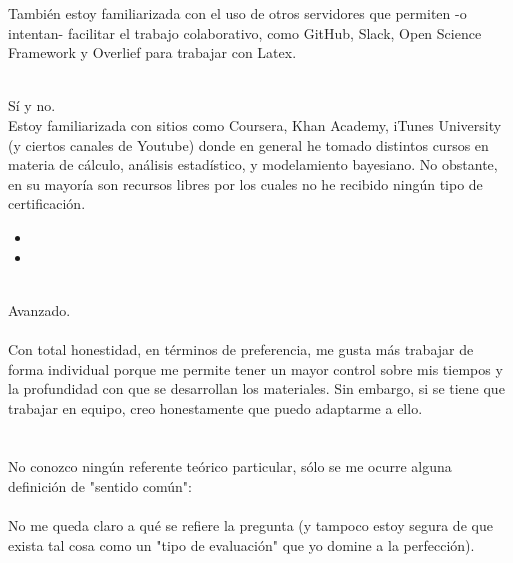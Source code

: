 \documentclass[11pt]{article}
\begin{document}
\begin{question}
También estoy familiarizada con el uso de otros servidores que permiten -o intentan- facilitar el trabajo colaborativo, como GitHub, Slack, Open Science Framework y Overlief para trabajar con Latex.

\\

Sí y no.\\

Estoy familiarizada con sitios como Coursera, Khan Academy, iTunes University (y ciertos canales de Youtube) donde en general he tomado distintos cursos en materia de cálculo, análisis estadístico, y modelamiento bayesiano. No obstante, en su mayoría son recursos libres por los cuales no he recibido ningún tipo de certificación.\\

\begin{itemize}
	\item
	\item
\end{itemize}


\\
Avanzado.\\

\\
Con total honestidad, en términos de preferencia, me gusta más trabajar de forma individual porque me permite tener un mayor control sobre mis tiempos y la profundidad con que se desarrollan los materiales. Sin embargo, si se tiene que trabajar en equipo, creo honestamente que puedo adaptarme a ello.\\

\\


\\
No conozco ningún referente teórico particular, sólo se me ocurre alguna definición de "sentido común":\\

\\
No me queda claro a qué se refiere la pregunta (y tampoco estoy segura de que exista tal cosa como un "tipo de evaluación" que yo domine a la perfección).\\


\end{question}
\end{document}
